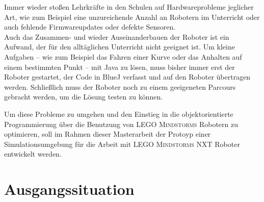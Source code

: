 \documentclass[paper=a4, DIV=14, BCOR=15mm, twoside=on, onecolumn=on, open = right, titlepage =on, parskip =half, headsepline = on, footsepline = on, chapterprefix = on, appendixprefix = off, fontsize = 12pt, numbers = noenddot, abstract = on]{scrbook}
\begin{document}
Immer wieder stoßen Lehrkräfte in den Schulen auf Hardwareprobleme jeglicher Art, wie zum Beispiel eine unzureichende Anzahl an Robotern im Unterricht oder auch fehlende Firmwareupdates oder defekte Sensoren.\\
Auch das Zusammen- und wieder Auseinanderbauen der Roboter ist ein Aufwand, der für den alltäglichen Unterricht nicht geeignet ist. Um kleine Aufgaben -- wie zum Beispiel das Fahren einer Kurve oder das Anhalten auf einem bestimmten Punkt -- mit Java zu lösen, muss bisher immer erst der Roboter gestartet, der Code in BlueJ verfasst und auf den Roboter übertragen werden. Schließlich muss der Roboter noch zu einem geeigeneten Parcours gebracht werden, um die Lösung testen zu können.

Um diese Probleme zu umgehen und den Einstieg in die objektorientierte Programmierung über die Benutzung von \textsc{LEGO Mindstorms} Robotern zu optimieren, soll im Rahmen dieser Masterarbeit der Protoyp einer Simulationsumgebung für die Arbeit mit \textsc{LEGO Mindstorms} NXT Roboter entwickelt werden.
\newpage
\par\singlespacing
\chapter{Ausgangssituation}

\par\singlespacing
\end{document}
